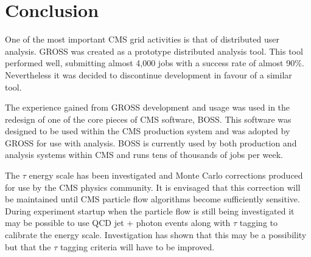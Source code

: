%
%

\chapter{Conclusion}



One of the most important CMS grid activities is that of distributed user analysis. GROSS was created as a prototype distributed analysis tool. This tool performed well, submitting almost 4,000 jobs with a success rate of almost 90\%. Nevertheless it was decided to discontinue development in favour of a similar tool. 

The experience gained from GROSS development and usage was used in the redesign of one of the core pieces of CMS software, BOSS. This software was designed to be used within the CMS production system and was adopted by GROSS for use with analysis. BOSS is currently used by both production and analysis systems within CMS and runs tens of thousands of jobs per week.



The $\tau$ energy scale has been investigated and Monte Carlo corrections produced for use by the CMS physics community. It is envisaged that this correction will be maintained until CMS particle flow algorithms become sufficiently sensitive. During experiment startup when the particle flow is still being investigated it may be possible to use QCD jet + photon events along with $\tau$ tagging to calibrate the energy scale. Investigation has shown that this may be a possibility but that the $\tau$ tagging criteria will have to be improved.


